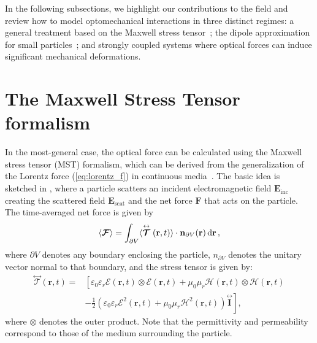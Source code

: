  In the following subsections, we highlight our contributions to the field and review how to model optomechanical interactions in three distinct regimes: a general treatment based on the Maxwell stress tensor~\cite{ownpub2}; 
 the dipole approximation for small particles~\cite{ownpub1, ownpub3}; and strongly coupled systems where optical forces can induce significant mechanical deformations.
\section{The Maxwell Stress Tensor formalism~\cite{ownpub3}}

In the most-general case, the optical force can be calculated using the Maxwell stress tensor (MST) formalism, which can be derived from the generalization of the Lorentz force (\eqref{eq:lorentz_f}) in continuous media~\cite{novotny}.
The basic idea is sketched in , where
a particle scatters an incident electromagnetic field $\mathbf{E}_\text{inc}$ creating the scattered field $\mathbf{E}_\text{scat}$ and the net force $\mathbf{F}$ that acts
on the particle. The time-averaged net force is given by
\begin{equation}\label{eq:f_MST}
    \langle\bm{\mathcal{F}}\rangle=\int_{\partial V}\langle\stackrel{\leftrightarrow}{\bm{\mathcal{T}}}(\mathbf{r}, t)\rangle \cdot \mathbf{n}_{\partial V}(\mathbf{r}) \mathop{}\!\text{d} \mathbf{r}\,,
\end{equation}
where $\partial V$ denotes any boundary enclosing the particle, $n_{\partial V}$ denotes the unitary vector normal to that boundary, and
the stress tensor is given by:
\begin{equation}
    \begin{aligned}
        \stackrel{\leftrightarrow}{\bm{\mathcal{T}}}(\mathbf{r}, t)= & {\left[\varepsilon_0 \varepsilon_r \mathcal{E}(\mathbf{r}, t) \otimes \mathcal{E}(\mathbf{r}, t)+\mu_0 \mu_r \mathcal{H}(\mathbf{r}, t) \otimes \mathcal{H}(\mathbf{r}, t)\right.} \\
    & \left.-\frac{1}{2}\left(\varepsilon_0 \varepsilon_r \mathcal{E}^2(\mathbf{r}, t)+\mu_0 \mu_r \mathcal{H}^2(\mathbf{r}, t)\right) \stackrel{\leftrightarrow}{\mathbf{I}}\right],
    \end{aligned}
\end{equation}
where $\otimes$ denotes the outer product. Note that the permittivity and permeability correspond to those of the medium surrounding the particle.


